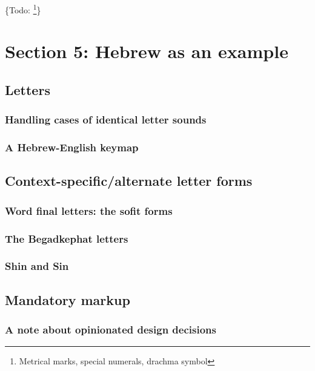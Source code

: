 \documentclass[11pt]{article}
\begin{document}
\{Todo: \footnote{Metrical marks, special numerals, drachma symbol}\}

\section{Section 5: Hebrew as an example}
\label{sec:org69bac51}

\subsection{Letters}
\label{sec:org75fe38e}

\subsubsection{Handling cases of identical letter sounds}
\label{sec:org8fd2b12}

\subsubsection{A Hebrew-English keymap}
\label{sec:orgc985b20}

\subsection{Context-specific/alternate letter forms}
\label{sec:orgdff8cd7}

\subsubsection{Word final letters: the sofit forms}
\label{sec:org30173cc}

\subsubsection{The Begadkephat letters}
\label{sec:org5f0555d}

\subsubsection{Shin and Sin}
\label{sec:org2e95369}

\subsection{Mandatory markup}
\label{sec:org35761b9}

\subsubsection{A note about opinionated design decisions}
\label{sec:org7858ff1}
\end{document}
